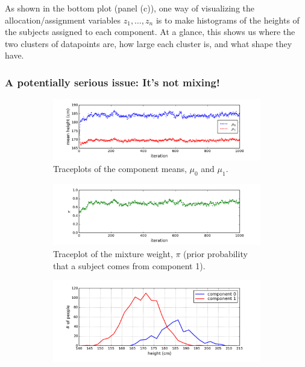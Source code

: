 \documentclass[12pt]{article}
\begin{document}
As shown in the bottom plot (panel (c)), one way of visualizing the allocation/assignment variables $z_1,\ldots,z_n$ is to make histograms of the heights of the subjects assigned to each component. At a glance, this shows us where the two clusters of datapoints are, how large each cluster is, and what shape they have.


\subsubsection{A potentially serious issue: It's not mixing!}

\begin{figure}
    \centering
    \begin{subfigure}[t]{1\textwidth}
        \centering
        \includegraphics[trim=0 0.4cm 0 0, clip, width=1\textwidth]{mix-mu_trace-b.png}
        \caption{Traceplots of the component means, $\mu_0$ and $\mu_1$.}
    \end{subfigure}
    \begin{subfigure}[t]{1\textwidth}
        \centering
        \includegraphics[trim=0 0.4cm 0 0, clip, width=1\textwidth]{mix-p_trace-b.png}
        \caption{Traceplot of the mixture weight, $\pi$ (prior probability that a subject comes from component 1).}
    \end{subfigure}
    \begin{subfigure}[t]{1\textwidth}
        \centering
        \includegraphics[trim=0 0.4cm 0 0, clip, width=1\textwidth]{mix-histograms_at_last_sample-b.png}

\end{subfigure}
\end{figure}
\end{document}

